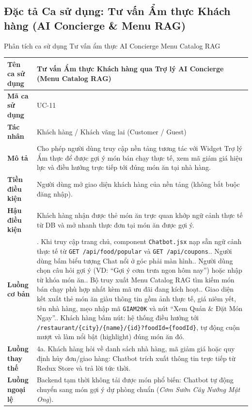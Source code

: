 \documentclass{uetgraduation}
\begin{document}
\subsection{Đặc tả Ca sử dụng: Tư vấn Ẩm thực Khách hàng (AI Concierge \& Menu RAG)}
\begin{table}[!htbp]{Phân tích ca sử dụng Tư vấn ẩm thực AI Concierge Menu Catalog RAG}
\centering
\small
\begin{tabularx}{\textwidth}{|l|>{\raggedright\arraybackslash}X|}
\hline
\textbf{Tên ca sử dụng} & \textbf{Tư vấn Ẩm thực Khách hàng qua Trợ lý AI Concierge (Menu Catalog RAG)} \\ \hline
\textbf{Mã ca sử dụng} & UC-11 \\ \hline
\textbf{Tác nhân} & Khách hàng / Khách vãng lai (Customer / Guest) \\ \hline
\textbf{Mô tả} & Cho phép người dùng truy cập nền tảng tương tác với Widget Trợ lý Ẩm thực để được gợi ý món bán chạy thực tế, xem mã giảm giá hiệu lực và điều hướng trực tiếp tới đúng món ăn tại nhà hàng. \\ \hline
\textbf{Tiền điều kiện} & Người dùng mở giao diện khách hàng của nền tảng (không bắt buộc đăng nhập). \\ \hline
\textbf{Hậu điều kiện} & Khách hàng nhận được thẻ món ăn trực quan khớp ngữ cảnh thực tế từ DB và mở nhanh thực đơn tại món ăn được gợi ý. \\ \hline
\textbf{Luồng cơ bản} & 
1. Khi truy cập trang chủ, component \texttt{Chatbot.jsx} nạp sẵn ngữ cảnh thực tế từ \texttt{GET /api/food/popular} và \texttt{GET /api/coupons}.\newline
2. Người dùng bấm biểu tượng Chat nổi ở góc phải màn hình.\newline
3. Người dùng chọn câu hỏi gợi ý (VD: ``Gợi ý cơm trưa ngon hôm nay'') hoặc nhập từ khóa món ăn.\newline
4. Bộ truy xuất Menu Catalog RAG tìm kiếm món bán chạy phù hợp nhất kèm mã ưu đãi đang kích hoạt.\newline
5. Giao diện kết xuất thẻ món ăn giàu thông tin gồm ảnh thực tế, giá niêm yết, tên nhà hàng, mẹo nhập mã \texttt{GIAM20K} và nút ``Xem Quán \& Đặt Món Ngay''.\newline
6. Khách hàng bấm nút: hệ thống điều hướng tới \texttt{/restaurant/\{city\}/\{name\}/\{id\}?foodId=\{foodId\}}, tự động cuộn mượt và làm nổi bật (highlight) đúng món ăn đó. \\ \hline
\textbf{Luồng thay thế} & 
4a. Khách hàng hỏi về danh sách nhà hàng, mã giảm giá hoặc quy định hủy đơn/giao hàng: Chatbot trích xuất thông tin trực tiếp từ Redux Store và trả lời tức thời. \\ \hline
\textbf{Luồng ngoại lệ} & 
Backend tạm thời không tải được món phổ biến: Chatbot tự động chuyển sang món gợi ý dự phòng chuẩn (\textit{Cơm Sườn Cây Nướng Mật Ong}). \\ \hline
\end{tabularx}
\end{table}
\clearpage
\end{document}
